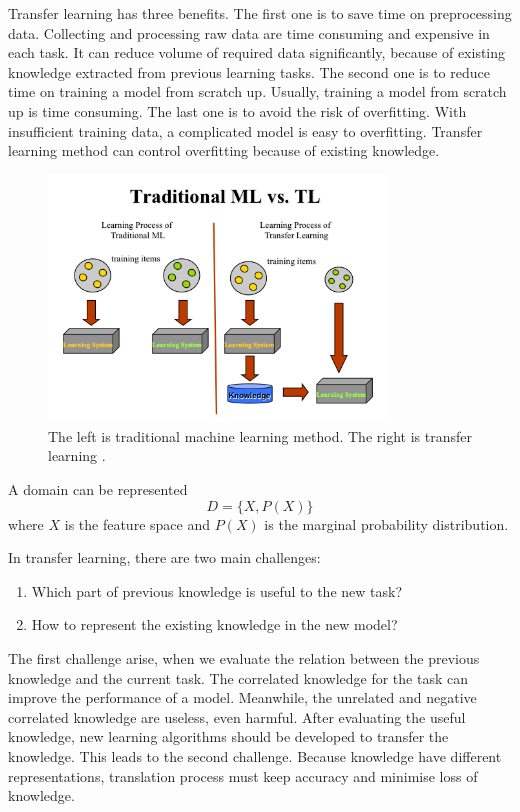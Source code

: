 Transfer learning has three benefits. The first one is to save time on preprocessing data. Collecting and processing raw data are time consuming and expensive in each task. It can reduce volume of required data significantly, because of existing knowledge extracted from previous learning tasks. The second one is to reduce time on training a model from scratch up. Usually, training a model from scratch up is time consuming. The last one is to avoid the risk of overfitting. With insufficient training data, a complicated model is easy to overfitting. Transfer learning method can control overfitting because of existing knowledge.

\graphicspath{ {./Figures/} }
\begin{figure}[!htb]
\centering
\includegraphics[width=0.8\textwidth]{MLvsTL.png}
\caption{\label{fig:TransferLearning}The left is traditional machine learning method. The right is transfer learning \citep{TransferlearningDiagram}.}
\end{figure}

A domain can be represented
\begin{equation}\label{eq:TransLearning}
D = \{ X, P(X) \}
\end{equation}
where $X$ is the feature space and $P(X)$ is the marginal probability distribution. 

In transfer learning, there are two main challenges: 
\begin{enumerate}
  \item Which part of previous knowledge is useful to the new task?
  \item How to represent the existing knowledge in the new model?
\end{enumerate}
The first challenge arise, when we evaluate the relation between the previous knowledge and the current task. The correlated knowledge for the task can improve the performance of a model. Meanwhile, the unrelated and negative correlated knowledge are useless, even harmful. After evaluating the useful knowledge, new learning algorithms should be developed to transfer the knowledge. This leads to the second challenge. Because knowledge have different representations, translation process must keep accuracy and minimise loss of knowledge. 